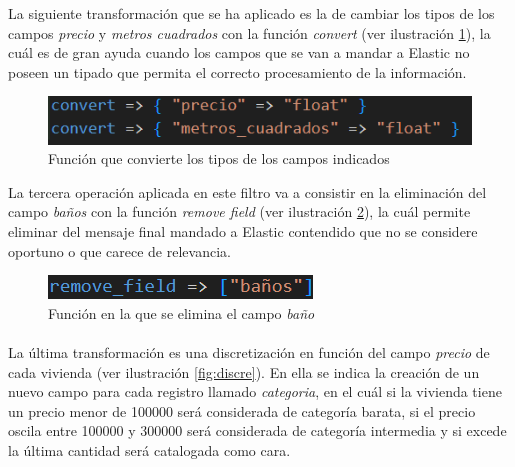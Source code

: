 La siguiente transformación que se ha aplicado es la de cambiar los tipos de los campos \textit{precio} y \textit{metros cuadrados} con la función \textit{convert}  (ver ilustración  \ref{fig:convert}), la cuál es de gran ayuda cuando los campos que se van a mandar a Elastic no poseen un tipado que permita el correcto procesamiento de la información.

\begin{figure}
    \centering
    \includegraphics[width=1\linewidth]{img/convert.png}
    \caption{Función que convierte los tipos de los campos indicados}
    \label{fig:convert}
\end{figure}

La tercera operación aplicada en este filtro va a consistir en la eliminación del campo \textit{baños} con la función \textit{remove field}  (ver ilustración  \ref{fig:remove}), la cuál permite eliminar del mensaje final mandado a Elastic contendido que no se considere oportuno o que carece de relevancia.

\begin{figure}
    \centering
    \includegraphics[width=1\linewidth]{img/remove.png}
    \caption{Función en la que se elimina el campo \textit{baño}}
    \label{fig:remove}
\end{figure}
\paragraph{}

La última transformación es una discretización en función del campo \textit{precio} de cada vivienda  (ver ilustración  \ref{fig:discre}). En ella se indica la creación de un nuevo campo para cada registro llamado \textit{categoria}, en el cuál si la vivienda tiene un precio menor de 100000 será considerada de categoría barata, si el precio oscila entre 100000 y 300000 será considerada de categoría intermedia y si excede la última cantidad será catalogada como cara.

